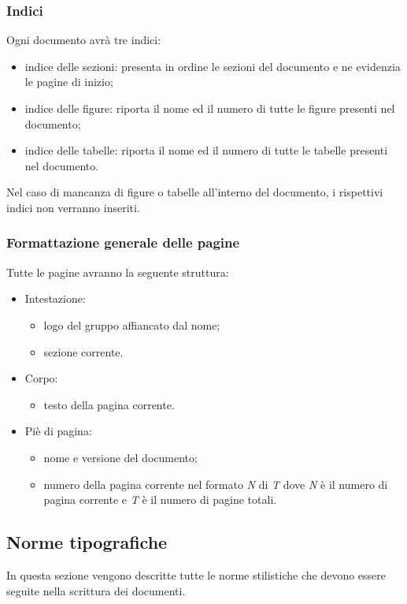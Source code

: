 \subsubsection{Indici}
Ogni documento avrà tre indici: 
\begin{itemize}
	\item indice delle sezioni: presenta in ordine le sezioni del documento e ne evidenzia le pagine di inizio;
	\item indice delle figure: riporta il nome ed il numero di tutte le figure presenti nel documento;
	\item indice delle tabelle: riporta il nome ed il numero di tutte le tabelle presenti nel documento.
\end{itemize}
Nel caso di mancanza di figure o tabelle all'interno del documento, i rispettivi indici non verranno inseriti.

\subsubsection{Formattazione generale delle pagine}
Tutte le pagine avranno la seguente struttura:
\begin{itemize}
	\item Intestazione:
	\begin{itemize}
		\item logo del gruppo affiancato dal nome;
		\item sezione corrente.
	\end{itemize}
		\item Corpo:
		\begin{itemize}
			\item testo della pagina corrente.
		\end{itemize}
	\item Piè di pagina:
	\begin{itemize}
		\item nome e versione del documento;
		\item numero della pagina corrente nel formato \textit{N} di \textit{T} dove \textit{N} è il numero di pagina corrente e \textit{T} è il numero di pagine totali.
	\end{itemize}
\end{itemize}

\subsection{Norme tipografiche}
In questa sezione vengono descritte tutte le norme stilistiche che devono essere seguite nella scrittura dei documenti.

